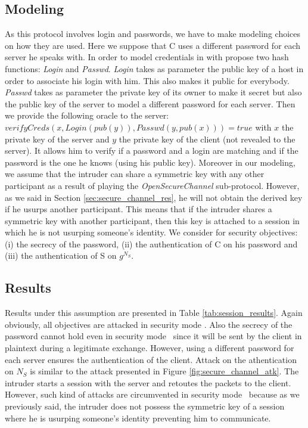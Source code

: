 \subsection{Modeling}

As this protocol involves login and passwords, we have to make modeling choices
on how they are used.
Here we suppose that C uses a different password for each server he speaks with.
In order to model credentials in \proverif with propose two hash functions:
{\em Login} and {\em Passwd}.
{\em Login} takes as parameter the public key of a host in order to associate
his login with him. This also makes it public for everybody.
{\em Passwd} takes as parameter the private key of its owner to make it secret
but also the public key of the server to model a different password for each
server.
Then we provide the following oracle to the server:
$verifyCreds(x, Login(pub(y)), Passwd(y, pub(x))) = true$ with $x$ the private
key of the server and $y$ the private key of the client (not revealed to the
server).
It allows him to verify if a password and a login are matching and if the
password is the one he knows (using his public key).
Moreover in our modeling, we assume that the intruder can share a symmetric key
with any other participant as a result of playing the {\em OpenSecureChannel}
sub-protocol.
However, as we said in Section \ref{sec:secure_channel_res}, he will not obtain
the derived key if he usurps another participant.
This means that if the intruder shares a symmetric key with another participant,
then this key is attached to a session in which he is not usurping someone's
identity.
We consider for security objectives: (i) the secrecy of the password, (ii)
the authentication of C on his password and (iii) the authentication of S on
$g^{N_{S}}$.

\subsection{Results}

Results under this assumption are presented in Table \ref{tab:session_results}.
Again obviously, all objectives are attacked in security mode \smn.
Also the secrecy of the password cannot hold even in security mode \sms~since
it will be sent by the client in plaintext during a legitimate exchange.
However, using a different password for each server ensures the authentication
of the client.
Attack on the athentication on $N_{S}$ is similar to the attack presented in
Figure \ref{fig:secure_channel_atk}.
The intruder starts a session with the server and retoutes the packets to the
client.
However, such kind of attacks are circumvented in security mode \smse~because
as we previously said, the intruder does not possess the symmetric key of a
session where he is usurping someone's identity preventing him to communicate.

